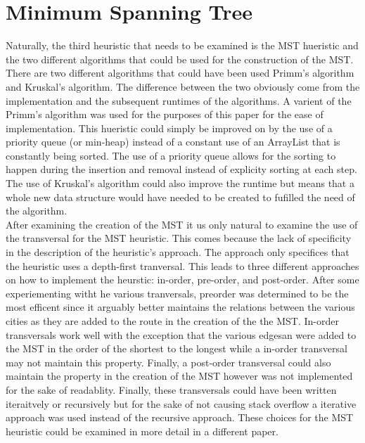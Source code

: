 \documentclass[midd]{thesis}
\newcommand{\tab}{\hspace*{2em}}
\begin{document}
\section{Minimum Spanning Tree}
\tab Naturally, the third heuristic that needs to be examined is the MST hueristic and the two different algorithms that could be used for the construction of the MST. There are two different algorithms that could have been used Primm's algorithm and Kruskal's algorithm. The difference between the two obviously come from the implementation and the subsequent runtimes of the algorithms. A varient of the Primm's algorithm was used for the purposes of this paper for the ease of implementation. This hueristic could simply be improved on by the use of a priority queue (or min-heap) instead of a constant use of an ArrayList that is constantly being sorted. The use of a priority queue allows for the sorting to happen during the insertion and removal instead of explicity sorting at each step. The use of Kruskal's algorithm could also improve the runtime but means that a whole new data structure would have needed to be created to fufilled the need of the algorithm.\\
\tab After examining the creation of the MST it us only natural to examine the use of the transversal for the MST heuristic. This comes because the lack of specificity in the description of the heuristic's approach. The approach only specifices that the heuristic uses a depth-first tranversal. This leads to three different approaches on how to implement the heurstic: in-order, pre-order, and post-order. After some experiementing witht he various tranversals, preorder was determined to be the most efficent since it arguably better maintains the relations between the various cities as they are added to the route in the creation of the the MST. In-order transversals work well with the exception that the various edgesan were added to the MST in the order of the shortest to the longest while a in-order transversal may not maintain this property. Finally, a post-order transversal could also maintain the property in the creation of the MST however was not implemented for the sake of readablity. Finally, these transversals could have been written iteraitvely or recursively but for the sake of not causing stack overflow a iterative approach was used instead of the recursive approach. These choices for the MST heuristic could be examined in more detail in a different paper.\\
\end{document}
